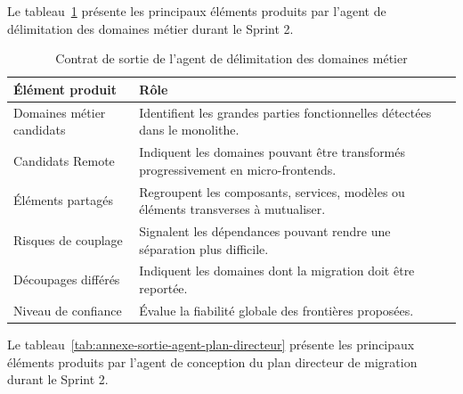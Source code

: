 
Le tableau~\ref{tab:annexe-sortie-agent-domaines} présente les principaux éléments produits par l'agent de délimitation des domaines métier durant le Sprint 2.

\begingroup
\renewcommand{\arraystretch}{1.12}
\setlength{\tabcolsep}{4pt}
\begin{longtable}{|p{4cm}|p{9.2cm}|}
\caption{Contrat de sortie de l'agent de délimitation des domaines métier}\label{tab:annexe-sortie-agent-domaines}\\
\hline
\textbf{Élément produit} & \textbf{Rôle} \\
\hline
Domaines métier candidats & Identifient les grandes parties fonctionnelles détectées dans le monolithe. \\
\hline
Candidats Remote & Indiquent les domaines pouvant être transformés progressivement en micro-frontends. \\
\hline
Éléments partagés & Regroupent les composants, services, modèles ou éléments transverses à mutualiser. \\
\hline
Risques de couplage & Signalent les dépendances pouvant rendre une séparation plus difficile. \\
\hline
Découpages différés & Indiquent les domaines dont la migration doit être reportée. \\
\hline
Niveau de confiance & Évalue la fiabilité globale des frontières proposées. \\
\hline
\end{longtable}
\endgroup


Le tableau~\ref{tab:annexe-sortie-agent-plan-directeur} présente les principaux éléments produits par l'agent de conception du plan directeur de migration durant le Sprint 2.

